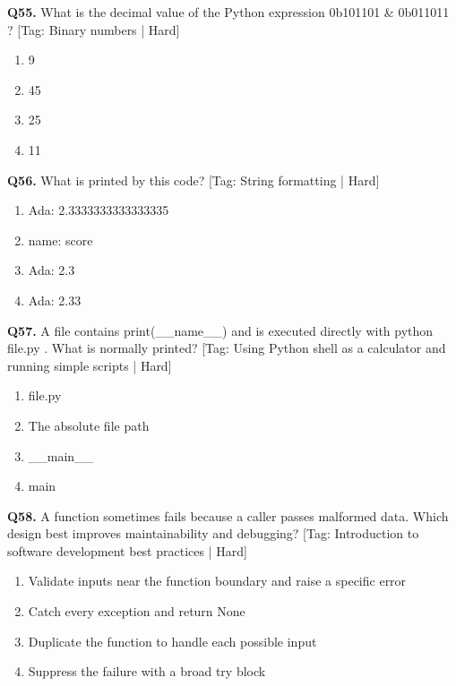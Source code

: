 \vspace{2mm}
\noindent\textbf{Q55.} What is the decimal value of the Python expression 0b101101 \& 0b011011 ? \hfill [Tag: Binary numbers | Hard]
\begin{enumerate}[label=(\alph*),topsep=2pt,itemsep=1pt,partopsep=0pt,parsep=0pt]
    \item {9}
    \item {45}
    \item {25}
    \item {11}
\end{enumerate}
\vspace{2mm}
\noindent\textbf{Q56.} What is printed by this code? \hfill [Tag: String formatting | Hard]
\begin{enumerate}[label=(\alph*),topsep=2pt,itemsep=1pt,partopsep=0pt,parsep=0pt]
    \item {Ada: 2.3333333333333335}
    \item {name: score}
    \item {Ada: 2.3}
    \item {Ada: 2.33}
\end{enumerate}
\vspace{2mm}
\noindent\textbf{Q57.} A file contains print(\_\_name\_\_) and is executed directly with python file.py . What is normally printed? \hfill [Tag: Using Python shell as a calculator and running simple scripts | Hard]
\begin{enumerate}[label=(\alph*),topsep=2pt,itemsep=1pt,partopsep=0pt,parsep=0pt]
    \item {file.py}
    \item {The absolute file path}
    \item {\_\_main\_\_}
    \item {main}
\end{enumerate}
\vspace{2mm}
\noindent\textbf{Q58.} A function sometimes fails because a caller passes malformed data. Which design best improves maintainability and debugging? \hfill [Tag: Introduction to software development best practices | Hard]
\begin{enumerate}[label=(\alph*),topsep=2pt,itemsep=1pt,partopsep=0pt,parsep=0pt]
    \item {Validate inputs near the function boundary and raise a specific error}
    \item {Catch every exception and return None}
    \item {Duplicate the function to handle each possible input}
    \item {Suppress the failure with a broad try block}
\end{enumerate}
